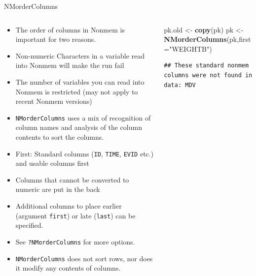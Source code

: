 \documentclass[
  8pt,
  ignorenonframetext,
  aspectratio=169]{beamer}
\newenvironment{Shaded}{\begin{snugshade}}{\end{snugshade}}
\newcommand{\DataTypeTok}[1]{\textcolor[rgb]{0.13,0.29,0.53}{#1}}
\newcommand{\KeywordTok}[1]{\textcolor[rgb]{0.13,0.29,0.53}{\textbf{#1}}}
\newcommand{\NormalTok}[1]{#1}
\newcommand{\StringTok}[1]{\textcolor[rgb]{0.31,0.60,0.02}{#1}}
\begin{document}
\begin{frame}[fragile]{NMorderColumns}
\protect\hypertarget{nmordercolumns}{}
\begin{columns}[T]
\begin{column}{0.48\textwidth}
\vspace{12pt}

\begin{itemize}
\item
  The order of columns in Nonmem is important for two reasons.
\item
  Non-numeric Characters in a variable read into Nonmem will make the
  run fail
\item
  The number of variables you can read into Nonmem is restricted (may
  not apply to recent Nonmem versions)
\item
  \texttt{NMorderColumns} uses a mix of recognition of column names and
  analysis of the column contents to sort the columns.
\item
  First: Standard columns (\texttt{ID}, \texttt{TIME}, \texttt{EVID}
  etc.) and usable columns first
\item
  Columns that cannot be converted to numeric are put in the back
\item
  Additional columns to place earlier (argument \texttt{first}) or late
  (\texttt{last}) can be specified.
\item
  See \texttt{?NMorderColumns} for more options.
\item
  \texttt{NMorderColumns} does not sort rows, nor does it modify any
  contents of columns.
\end{itemize}
\end{column}

\begin{column}{0.48\textwidth}
\footnotesize

\begin{Shaded}
\begin{Highlighting}[]
\NormalTok{pk.old \textless{}{-}}\StringTok{ }\KeywordTok{copy}\NormalTok{(pk)}
\NormalTok{pk \textless{}{-}}\StringTok{ }\KeywordTok{NMorderColumns}\NormalTok{(pk,}\DataTypeTok{first=}\StringTok{"WEIGHTB"}\NormalTok{)}
\end{Highlighting}
\end{Shaded}

\begin{verbatim}
## These standard nonmem columns were not found in data: MDV
\end{verbatim}

\normalsize


\end{column}
\end{columns}
\end{frame}
\end{document}
